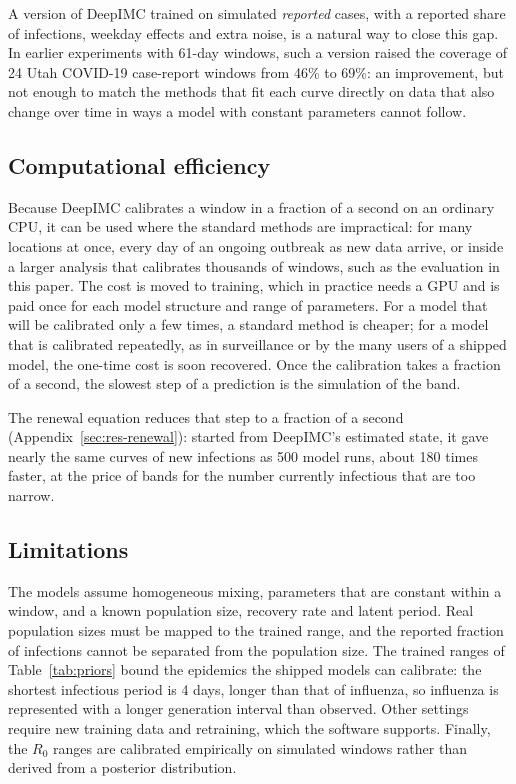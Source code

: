 \documentclass[12pt]{article}
\begin{document}
A version of DeepIMC trained on simulated \emph{reported} cases, with a reported share of infections,
weekday effects and extra noise, is a natural way to close this gap. In earlier experiments with 61-day
windows, such a version raised the coverage of 24 Utah COVID-19 case-report windows from 46\% to 69\%: an
improvement, but not enough to match the methods that fit each curve directly on data that also change
over time in ways a model with constant parameters cannot follow.

\subsection{Computational efficiency}

Because DeepIMC calibrates a window in a fraction of a second on an ordinary CPU, it can be used where the
standard methods are impractical: for many locations at once, every day of an ongoing outbreak as new
data arrive, or inside a larger analysis that calibrates thousands of windows, such as the evaluation in
this paper. The cost is moved to training, which in practice needs a GPU and is paid once for each model
structure and range of parameters. For a model that will be calibrated only a few times, a standard
method is cheaper; for a model that is calibrated repeatedly, as in surveillance or by the many users of
a shipped model, the one-time cost is soon recovered. Once the calibration takes a fraction of a second,
the slowest step of a prediction is the simulation of the band.

The renewal equation reduces that step to a fraction of a second (Appendix~\ref{sec:res-renewal}): started from
DeepIMC's estimated state, it
gave nearly the same curves of new infections as 500 model runs, about 180 times faster, at the price of bands for the
number currently infectious that are too narrow.
\subsection{Limitations}

The models assume homogeneous mixing, parameters that are constant within a window, and a known
population size, recovery rate and latent period. Real population sizes must be mapped to the trained
range, and the reported fraction of infections cannot be separated from the population size. The trained
ranges of Table~\ref{tab:priors} bound the epidemics the shipped models can calibrate: the shortest
infectious period is 4 days, longer than that of influenza, so influenza is represented with a longer
generation interval than observed. Other settings require new training data and retraining, which the
software supports. Finally, the $R_0$ ranges are calibrated empirically on simulated windows rather than
derived from a posterior distribution.
\end{document}
